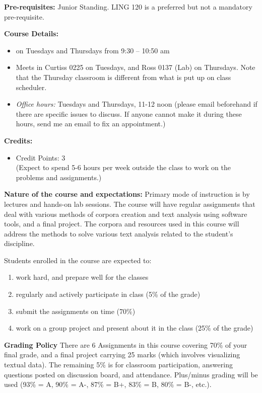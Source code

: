 \documentclass[11pt,a4paper]{article}
\begin{document}
\textbf{\large Pre-requisites:}
Junior Standing. LING 120 is a preferred but not a mandatory pre-requisite.

\bigskip

\textbf{\large Course Details:}
\begin{itemize}
\item on Tuesdays and Thursdays from 9:30 -- 10:50 am
\item Meets in Curtiss 0225 on Tuesdays, and Ross 0137 (Lab) on Thursdays. Note that the Thursday classroom is different from what is put up on class scheduler. 
\item \textit{Office hours:} Tuesdays and Thursdays, 11-12 noon (please email beforehand if there are specific issues to discuss. If anyone cannot make it during these hours, send me an email to fix an appointment.)
\end{itemize}
\textbf{\large Credits:} 
\begin{itemize}\vspace*{-.8\baselineskip}\itemsep0ex
\item Credit Points: 3
\\ (Expect to spend 5-6 hours per week outside the class to work on the problems and assignments.)
\end{itemize}

\bigskip \textbf{Nature of the course and expectations:} Primary mode of instruction is by lectures and hands-on lab sessions. The course will have regular assignments that deal with various methods of corpora creation and text analysis using software tools, and a final project. The corpora and resources used in this course will address the methods to solve various text analysis related to the student's discipline.

Students enrolled in the course are expected to:
\begin{enumerate}
\item work hard, and prepare well for the classes 
\item regularly and actively participate in class (5\% of the grade)
\item submit the assignments on time (70\%)
\item work on a group project and present about it in the class (25\% of the grade)
\end{enumerate}

\bigskip\textbf{\large Grading Policy}
There are 6 Assignments in this course covering 70\% of your final grade, and a final project carrying 25 marks (which involves visualizing textual data). The remaining 5\% is for classroom participation, answering questions posted on discussion board, and attendance. Plus/minus grading will be used (93\% = A, 90\% = A-, 87\% = B+, 83\% = B, 80\% = B-, etc.).
\end{document}
